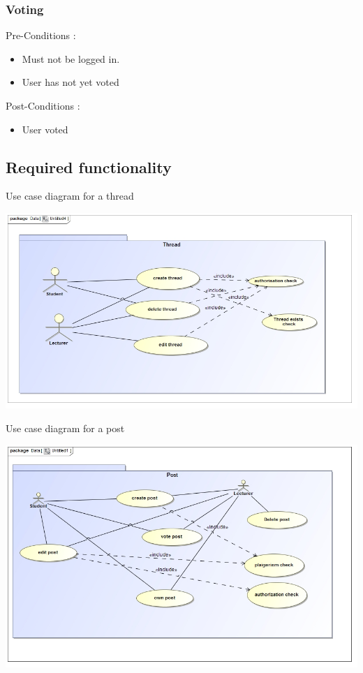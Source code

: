 \documentclass[12pt, oneside]{article}
\begin{document}
			\subsubsection{Voting}
				Pre-Conditions : \begin{itemize}
							\item Must not be logged in.
							\item User has not yet voted
						     \end{itemize}
				Post-Conditions : \begin{itemize}
							\item User voted
						     \end{itemize}	

	\subsection{Required functionality}
		Use case diagram for a thread
		
			 \includegraphics[scale=1]{thread}
			 
		Use case diagram for a post
		
			 \includegraphics[scale=1]{post}
			 
\end{document}
